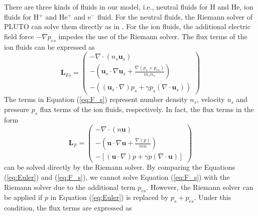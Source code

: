 \documentclass[journal, onecolumn]{aastex631}
\begin{document}
\begin{CJK*}{UTF8}{gbsn}
There are three kinds of fluids in our model, i.e., neutral fluids for H and He, ion fluids for H$^{+}$ and He$^{+}$ and e$^-$ fluid.  For the neutral fluids, the Riemann solver of PLUTO can solve them directly as in \cite{Toth2012}. For the ion fluids, the additional electric field force $-\nabla p_{es}$ impedes the use of the Riemann solver.
The flux terms of the ion fluids can be expressed as
\begin{equation}\label{eq:F_s}
\textbf{L}_{Fs} =
\begin{pmatrix}
-\nabla\cdot(n_{s}\textbf{u}_{s})\\
-(\textbf{u}_ {s}\cdot\nabla\textbf{u}_{s}+\frac{\nabla (p_{s}+p_{es})}{m_{s}n_{s}})\\
-((\textbf{u}_{s}\cdot\nabla)p_{s}+\gamma p_{s}(\nabla\cdot\textbf{u}_{s}))                                                                                                                                                                                                                                                                                                                                                                                      
\end{pmatrix}
\end{equation}
The terms in Equation ({\ref{eq:F_s}}) represent number density $n_s$, velocity $u_s$ and pressure $p_s$ flux terms of the ion fluids, respectively. In fact, the flux terms in the form
\begin{equation}\label{eq:Euler}
\textbf{L}_{F}=
\begin{pmatrix}
-\nabla\cdot(n\textbf{u})\\
-(\textbf{u}\cdot\nabla\textbf{u}+\frac{\nabla (p)}{mn})\\
-[(\textbf{u}\cdot\nabla)p+\gamma p(\nabla\cdot\textbf{u})]                                                                                                                                                                                                                                                                                                                                                                                      
\end{pmatrix}
\end{equation}
can be solved directly by the Riemann solver. By comparing the Equations (\ref{eq:Euler}) and (\ref{eq:F_s}), we cannot solve Equation (\ref{eq:F_s}) with the Riemann solver due to the additional term $p_{es}$. However, the Riemann solver can be applied if $p$ in Equation (\ref{eq:Euler}) is replaced by $p_{s}+p_{es}$. Under this condition, the flux terms are expressed as


\end{CJK*}
\end{document}
